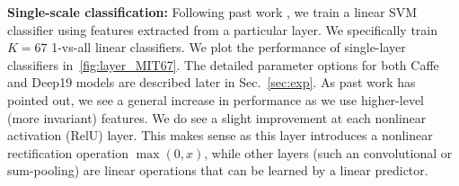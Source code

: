 \documentclass[10pt,twocolumn,letterpaper]{article}
\begin{document}


{\bf Single-scale classification:} Following past work \cite{cnn_baseline}, we train a linear SVM classifier using features extracted from a particular layer. We specifically train $K=67$ 1-vs-all linear classifiers.
We plot the performance of single-layer classifiers in~\ref{fig:layer_MIT67}. The detailed parameter options for both Caffe and Deep19 models are described later in Sec.~\ref{sec:exp}. As past work has pointed out, we see a general increase in performance as we use higher-level (more invariant) features. We do see a slight improvement at each nonlinear activation (RelU) layer. This makes sense as this layer introduces a nonlinear rectification operation $\max(0,x)$, while other layers (such an convolutional or sum-pooling) are linear operations that can be learned by a linear predictor.
\end{document}
